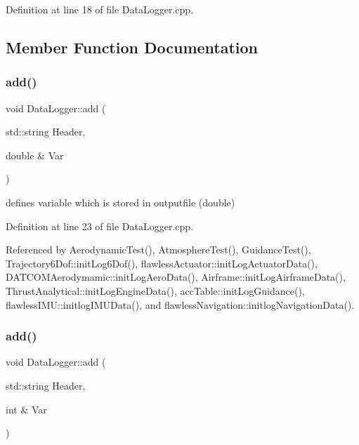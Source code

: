 Definition at line 18 of file Data\+Logger.\+cpp.



\subsection{Member Function Documentation}
\mbox{\label{class_data_logger_a9ea6897ea2031c0ec7744018a0539704}} 
\subsubsection{\texorpdfstring{add()}{add()}\hspace{0.1cm}{\footnotesize\ttfamily [1/2]}}
{\footnotesize\ttfamily void Data\+Logger\+::add (\begin{DoxyParamCaption}\item[{std\+::string}]{Header,  }\item[{double \&}]{Var }\end{DoxyParamCaption})}



defines variable which is stored in outputfile (double) 



Definition at line 23 of file Data\+Logger.\+cpp.



Referenced by Aerodynamic\+Test(), Atmosphere\+Test(), Guidance\+Test(), Trajectory6\+Dof\+::init\+Log6\+Dof(), flawless\+Actuator\+::init\+Log\+Actuator\+Data(), D\+A\+T\+C\+O\+M\+Aerodymamic\+::init\+Log\+Aero\+Data(), Airframe\+::init\+Log\+Airframe\+Data(), Thrust\+Analytical\+::init\+Log\+Engine\+Data(), acc\+Table\+::init\+Log\+Guidance(), flawless\+I\+M\+U\+::initlog\+I\+M\+U\+Data(), and flawless\+Navigation\+::initlog\+Navigation\+Data().

\mbox{\label{class_data_logger_afbe20d50f035057e397e540c30bb4596}} 
\subsubsection{\texorpdfstring{add()}{add()}\hspace{0.1cm}{\footnotesize\ttfamily [2/2]}}
{\footnotesize\ttfamily void Data\+Logger\+::add (\begin{DoxyParamCaption}\item[{std\+::string}]{Header,  }\item[{int \&}]{Var }\end{DoxyParamCaption})}




